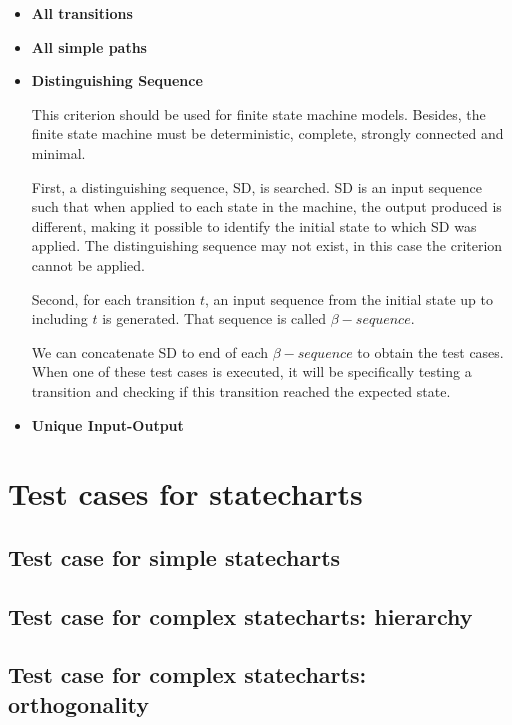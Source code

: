\begin{itemize}

\item \textbf{All transitions}

\item \textbf{All simple paths}

\item \textbf{Distinguishing Sequence}

This criterion should be used for finite state machine models. Besides, the finite state machine must be deterministic, complete, strongly connected and minimal. 

First, a distinguishing sequence, SD, is searched. SD is an input sequence such that when applied to each state in the machine, the output produced is different, making it possible to identify the initial state to which SD was applied. The distinguishing sequence may not exist, in this case the criterion cannot be applied.

Second, for each transition $t$, an input sequence from the initial state up to including $t$ is generated. That sequence is called $\beta-sequence$.

We can concatenate SD to end of each $\beta-sequence$ to obtain the test cases. When one of these test cases is executed, it will be specifically testing a transition and checking if this transition reached the expected state.

\item \textbf{Unique Input-Output}

\end{itemize}


\section{Test cases for statecharts}

\subsection{Test case for simple statecharts}

\subsection{Test case for complex statecharts: hierarchy}

\subsection{Test case for complex statecharts: orthogonality}
